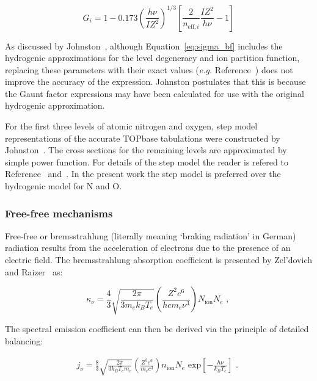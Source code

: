 \begin{equation}
 G_i = 1 - 0.173 \left ( \frac{h \nu}{I Z^2} \right )^{1/3} \left [ \frac{2}{n_{\text{eff},i}} \frac{I Z^2}{h \nu} - 1 \right ]
\end{equation}

As discussed by Johnston~\cite{JohnPhd}, although Equation~\ref{eq:sigma_bf} includes the hydrogenic approximations for the level degeneracy and ion partition function, replacing these parameters with their exact values (\textit{e.g.} Reference~\cite{Hartung91}) does not improve the accuracy of the expression.
Johnston postulates that this is because the Gaunt factor expressions may have been calculated for use with the original hydrogenic approximation.

\par

For the first three levels of atomic nitrogen and oxygen, step model representations of the accurate TOPbase tabulations were constructed by Johnston~\cite{JohnPhd}.
The cross sections for the remaining levels are approximated by simple power function.
For details of the step model the reader is refered to Reference~\cite{JohnPhd} and~\cite{JHS2008a}.
In the present work the step model is preferred over the hydrogenic model for N and O.

\subsubsection{Free-free mechanisms}

Free-free or bremsstrahlung (literally meaning `braking radiation' in German) radiation results from the acceleration of electrons due to the presence of an electric field.
The bremsstrahlung absorption coefficient is presented by Zel'dovich and Raizer~\cite{ZR} as:

\begin{equation}
 \kappa_{\nu} = \frac{4}{3} \sqrt{ \frac{2 \pi}{3 m_e k_B T_{e} }} \left ( \frac{Z^{2} e^{6}}{ h c m_e \nu^{3} } \right ) N_\text{ion} N_{e} \text{ , }
\end{equation}

\noindent The spectral emission coefficient can then be derived via the principle of detailed balancing:

\begin{eqnarray}
j_{\nu} = \frac{8 }{3} \sqrt{ \frac{2 \pi }{3 k_B T_{e} m_e }} \left ( \frac{Z^{2} e^{6}}{m_e c^{3}} \right ) n_\text{ion} N_{e} \text{~exp} \left [ - \frac{h \nu}{k_B T_e} \right ] \text{ . } \label{eq:brems_j}
\end{eqnarray}

